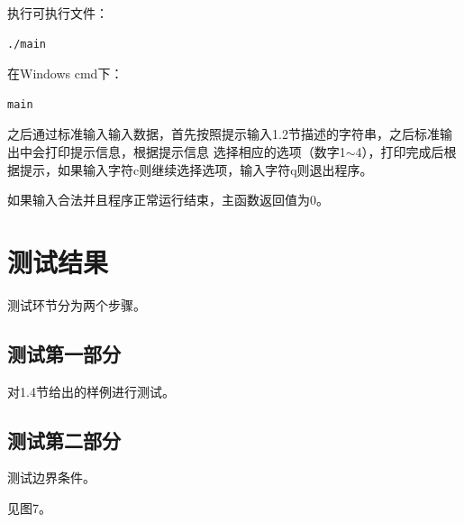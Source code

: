 \documentclass{article}
\begin{document}
执行可执行文件：

\begin{lstlisting}[language={bash},
    basicstyle=\small\consolas]
./main
\end{lstlisting}

在Windows cmd下：

\begin{lstlisting}[language={bash},
    basicstyle=\small\consolas]
main
\end{lstlisting}

之后通过标准输入输入数据，首先按照提示输入1.2节描述的字符串，之后标准输出中会打印提示信息，根据提示信息
选择相应的选项（数字1$\sim$4），打印完成后根据提示，如果输入字符c则继续选择选项，输入字符q则退出程序。

如果输入合法并且程序正常运行结束，主函数返回值为0。

\section{测试结果}

测试环节分为两个步骤。

\subsection{测试第一部分}

对1.4节给出的样例进行测试。

\subsection{测试第二部分}

测试边界条件。

见图7。
\end{document}
